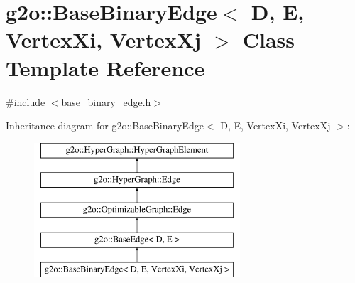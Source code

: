 \hypertarget{classg2o_1_1_base_binary_edge}{}\section{g2o\+:\+:Base\+Binary\+Edge$<$ D, E, Vertex\+Xi, Vertex\+Xj $>$ Class Template Reference}
\label{classg2o_1_1_base_binary_edge}


{\ttfamily \#include $<$base\+\_\+binary\+\_\+edge.\+h$>$}

Inheritance diagram for g2o\+:\+:Base\+Binary\+Edge$<$ D, E, Vertex\+Xi, Vertex\+Xj $>$\+:\begin{figure}[H]
\begin{center}
\leavevmode
\includegraphics[height=5.000000cm]{classg2o_1_1_base_binary_edge}
\end{center}
\end{figure}
